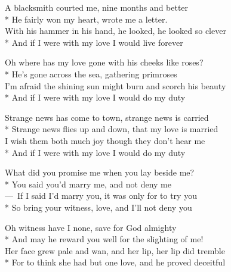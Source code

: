 
\contd
{}

\versemark
A blacksmith courted me, nine months and better\\*
He fairly won my heart, wrote me a letter.\\
With his hammer in his hand, he looked, he looked so clever\\*
And if I were with my love I would live forever

\versemark
Oh where has my love gone with his cheeks like roses?\\*
He’s gone across the sea, gathering primroses\\
I’m afraid the shining sun might burn and scorch his beauty\\*
And if I were with my love I would do my duty

\versemark
Strange news has come to town, strange news is carried\\*
Strange news flies up and down, that my love is married\\
I wish them both much joy though they don’t hear me\\*
And if I were with my love I would do my duty

\versemark
What did you promise me when you lay beside me?\\*
You said you’d marry me, and not deny me\\
— If I said I’d marry you, it was only for to try you\\*
So bring your witness, love, and I’ll not deny you

\versemark
Oh witness have I none, save for God almighty\\*
And may he reward you well for the slighting of me!\\
Her face grew pale and wan, and her lip, her lip did tremble\\*
For to think she had but one love, and he proved deceitful

